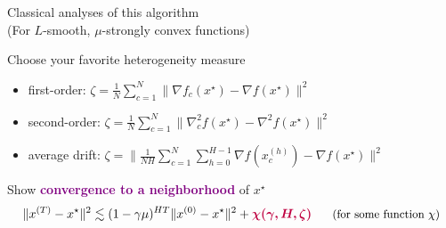 \documentclass[aspectratio=169,12pt]{beamer}
\begin{document}
\begin{frame}{Classical analyses of this algorithm\\[-0.5em]
    \small (For $L$-smooth, $\mu$-strongly convex functions)}

  Choose your favorite heterogeneity measure
  \begin{itemize}
  \item first-order: $\zeta = \frac{1}{N} \sum_{c=1}^N \big\| \nabla f_c(x^{\star}) - \nabla f(x^{\star}) \big\|^2$
  \item second-order: $\zeta = \frac{1}{N} \sum_{c=1}^N \big\| \nabla_c^2 f(x^{\star}) - \nabla^2 f(x^{\star}) \big\|^2$
  \item average drift: $\zeta = \big\| \frac{1}{NH} \sum_{c=1}^N \sum_{h=0}^{H-1} \nabla f(x_c^{(h)}) - \nabla f(x^{\star}) \big\|^2$
  \end{itemize}

  \vspace{0.5em}

  \pause

  Show \textcolor{purple}{\bfseries convergence to a neighborhood} of $x^\star$
  \begin{align*}
    \| x^{(T)} - x^\star \|^2 \lesssim (1 - \gamma \mu)^{HT} \| x^{(0)} - x^\star \|^2
    + \textcolor{purple}{\boldsymbol{\chi(\gamma, H, \zeta)}} ~~~~~\text{\small (for some function $\chi$)}
  \end{align*}

  \vspace{1em}

  
\end{frame}
\end{document}
